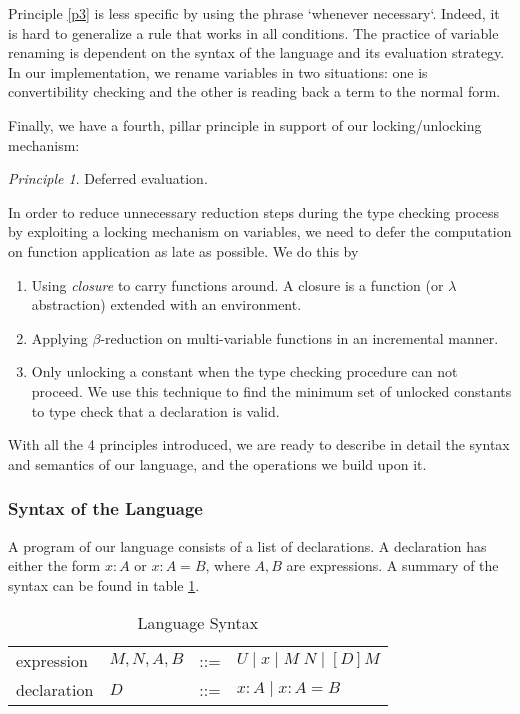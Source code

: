 \documentclass{article}
\theoremstyle{remark}
\newtheorem{principle}{Principle}
\begin{document}
Principle \ref{p3} is less specific by using the phrase `whenever necessary`. Indeed, it is hard to generalize a rule that works in all conditions. The practice of variable renaming is dependent on the syntax of the language and its evaluation strategy. In our implementation, we rename variables in two situations: one is convertibility checking and the other is reading back a term to the normal form.

Finally, we have a fourth, pillar principle in support of our locking/unlocking mechanism:
\begin{principle} \label{p4}
  Deferred evaluation.
\end{principle}

In order to reduce unnecessary reduction steps during the type checking process by exploiting a locking mechanism on variables, we need to defer the computation on function application as late as possible. We do this by
\begin{enumerate}
\item Using \emph{closure} to carry functions around. A closure is a function (or $\lambda$ abstraction) extended with an environment.
\item Applying $\beta$-reduction on multi-variable functions in an incremental manner.
\item Only unlocking a constant when the type checking procedure can not proceed. We use this technique to find the minimum set of unlocked constants to type check that a declaration is valid.
\end{enumerate}

With all the 4 principles introduced, we are ready to describe in detail the syntax and semantics of our language, and the operations we build upon it.

\subsubsection{Syntax of the Language}
A program of our language consists of a list of declarations. A declaration has either the form $x : A$ or $x : A = B$, where $A, B$ are expressions. A summary of the syntax can be found in table \ref{tab:syntax}.

\begin{table}[h]
  \centering
  \begin{tabular}{l l l l}
    expression & $M,N,A,B$ & ::= & $U \mid x \mid M \; N \mid [D] M $ \\
    declaration & $D$ & ::= & $x : A \mid x : A = B$
  \end{tabular}
  \caption{Language Syntax}
  \label{tab:syntax}
\end{table}
\end{document}
